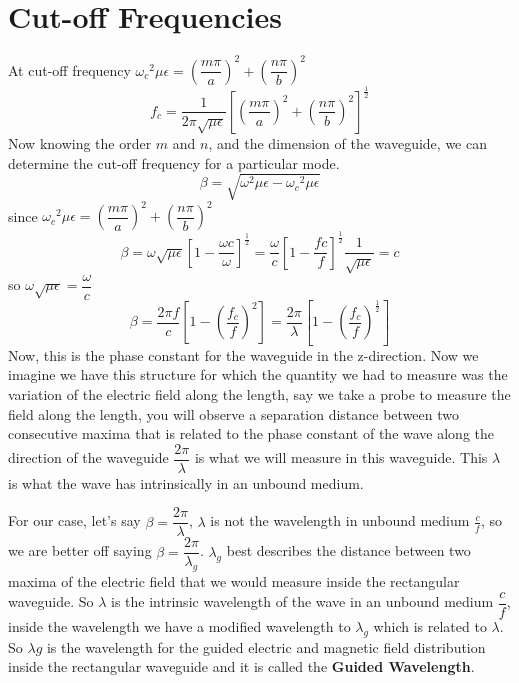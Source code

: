 \section{Cut-off Frequencies}
At cut-off frequency ${\omega_c}^2\mu\epsilon = \left(\dfrac{m\pi}{a}\right)^2 + \left(\dfrac{n\pi}{b}\right)^2$
\begin{dmath}
f_c = \frac{1}{2\pi \sqrt{\mu\epsilon}}\left[\left(\frac{m\pi}{a}\right)^2 + \left(\dfrac{n\pi}{b}\right)^2\right]^{\frac{1}{2}}
\label{eqn:cut-off}
\end{dmath}
Now knowing the order $m$ and $n$, and the dimension of the waveguide, we can determine the cut-off frequency for a particular mode.
\begin{dmath*}
\beta = \sqrt{{\omega}^2\mu\epsilon-{\omega_c}^2\mu\epsilon}
\end{dmath*}
since ${\omega_c}^2\mu\epsilon = \left(\dfrac{m\pi}{a}\right)^2 + \left(\dfrac{n\pi}{b}\right)^2$
\begin{dmath*}
\beta =\omega\sqrt{\mu\epsilon}\left[1-{\frac{\omega c}{\omega}}\right]^{\frac{1}{2}} = \frac{\omega}{c}\left [1-{\frac{fc}{f}}\right]^{\frac{1}{2}} \frac{1}{\sqrt{\mu\epsilon}}= c
\end{dmath*}
so $\omega{\sqrt{\mu\epsilon}}= \dfrac{\omega}{c}$
\begin{dmath}
\beta = \frac{2\pi f}{c}\left[1-\left(\frac{f_c}{f}\right)^2\right]
= \frac{2\pi}{\lambda}\left[1-\left(\frac{f_c}{f}\right)^{\frac{1}{2}}\right]
\label{eqn:phaseconstrec}
\end{dmath}
Now, this is the phase constant for the waveguide in the z-direction. Now we imagine we have this structure for which the quantity we had to measure was the variation of the electric field along the length, say we take a probe to measure the field along the length, you will observe a separation distance between two consecutive maxima that is related to the phase constant of the wave along the direction of the waveguide $\dfrac{2\pi}{\lambda}$ is what we will measure in this waveguide. This $\lambda$ is what the wave has intrinsically in an unbound medium.

For our case, let's say $\beta = \dfrac{2\pi}{\lambda}$, $\lambda$ is not the wavelength in unbound medium $\frac{c}{f}$, so we are better off saying  $\beta = \dfrac{2\pi}{\lambda_g}$. ${\lambda_g}$ best describes the distance between two maxima of the electric field that we would measure inside the rectangular waveguide. So $\lambda$ is the intrinsic wavelength of the wave in an unbound medium $\dfrac{c}{f}$, inside the wavelength we have a modified wavelength to $\lambda_g$ which is related to $\lambda$. So $\lambda g$ is the wavelength for the guided electric and magnetic field distribution inside the rectangular waveguide and it is called the \textbf{Guided Wavelength}. 

